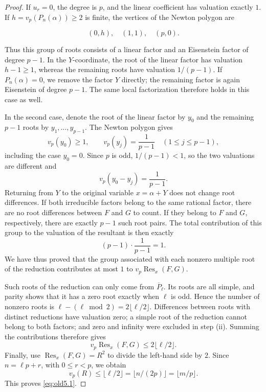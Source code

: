 \documentclass[11pt,a4paper]{article}
\numberwithin{equation}{section}
\theoremstyle{definition}
\begin{document}
\begin{proof}
If \(u_r=0\), the degree is \(p\), and the linear coefficient has valuation exactly \(1\). If \(h=v_p(P_n(\alpha))\ge2\) is finite, the vertices of the Newton polygon are

\[
(0,h),\quad(1,1),\quad(p,0).
\]

Thus this group of roots consists of a linear factor and an Eisenstein factor of degree \(p-1\). In the \(Y\)-coordinate, the root of the linear factor has valuation \(h-1\ge1\), whereas the remaining roots have valuation \(1/(p-1)\). If \(P_n(\alpha)=0\), we remove the factor \(Y\) directly; the remaining factor is again Eisenstein of degree \(p-1\). The same local factorization therefore holds in this case as well.

In the second case, denote the root of the linear factor by \(y_0\) and the remaining \(p-1\) roots by \(y_1,\ldots,y_{p-1}\). The Newton polygon gives
\[
v_p(y_0)\ge1,\qquad v_p(y_j)=\frac1{p-1}\quad(1\le j\le p-1),
\]
including the case \(y_0=0\). Since \(p\) is odd, \(1/(p-1)<1\), so the two valuations are different and
\[
v_p(y_0-y_j)=\frac1{p-1}.
\]
Returning from \(Y\) to the original variable \(x=\alpha+Y\) does not change root differences. If both irreducible factors belong to the same rational factor, there are no root differences between \(F\) and \(G\) to count. If they belong to \(F\) and \(G\), respectively, there are exactly \(p-1\) such root pairs. The total contribution of this group to the valuation of the resultant is then exactly
\[
(p-1)\cdot\frac1{p-1}=1.
\]
We have thus proved that the group associated with each nonzero multiple root of the reduction contributes at most \(1\) to \(v_p\operatorname{Res}_x(F,G)\).

Such roots of the reduction can only come from \(\overline P_{\ell}\). Its roots are all simple, and parity shows that it has a zero root exactly when \(\ell\) is odd. Hence the number of nonzero roots is \(\ell-(\ell\bmod2)=2\lfloor \ell/2\rfloor\). Differences between roots with distinct reductions have valuation zero; a simple root of the reduction cannot belong to both factors; and zero and infinity were excluded in step (ii). Summing the contributions therefore gives
\[
v_p\operatorname{Res}_x(F,G)\le2\lfloor \ell/2\rfloor.
\]
Finally, use \(\operatorname{Res}_x(F,G)=R^2\) to divide the left-hand side by \(2\). Since \(n=\ell p+r\), with \(0\le r<p\), we obtain
\[
v_p(R)\le\lfloor \ell/2\rfloor
=\lfloor n/(2p)\rfloor=\lfloor m/p\rfloor.
\]
This proves \eqref{eq:old5.1}.
\end{proof}
\end{document}
